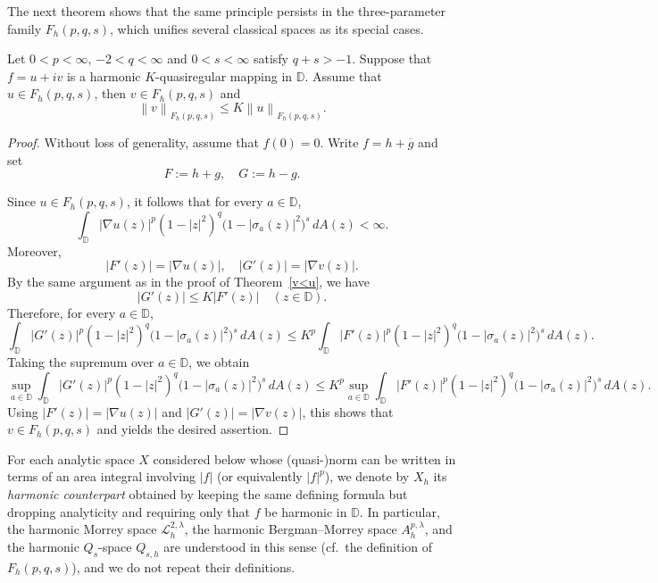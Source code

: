 \documentclass[12pt, reqno]{amsart}
\begin{document}
The next theorem shows that the same principle persists in the three-parameter family $F_h(p,q,s)$, which unifies several classical spaces as its special cases.

\begin{theorem}\label{v<u-F}
Let $0< p<\infty$, $-2<q<\infty$ and $0<s<\infty$ satisfy $q+s>-1$.
Suppose that $f=u+iv$ is a harmonic $K$-quasiregular mapping in $\mathbb D$.
Assume that $u\in F_h(p,q,s)$,
then $v\in F_h(p,q,s)$ and
$$\left \|v  \right \| _{F_h(p,q,s)}\le K\left \|u  \right \| _{F_h(p,q,s)}.$$
\end{theorem}

\begin{proof}
Without loss of generality, assume that $f(0)=0$. Write $f=h+\overline{g}$ and set
$$F:=h+g,\quad G:=h-g.$$

Since $u\in F_h(p,q,s)$, it follows that for every $a\in\mathbb D$,
$$
\int_{\mathbb{D}}|\nabla u(z)|^{p}(1-|z|^{2})^{q}\bigl(1-|\sigma_a(z)|^{2}\bigr)^{s}\,dA(z)<\infty.
$$
Moreover,
$$
|F'(z)|=\bigl|\nabla u(z)\bigr|,
\quad
|G'(z)|=\bigl|\nabla v(z)\bigr|.
$$
By the same argument as in the proof of Theorem~\ref{v<u}, we have
$$
|G'(z)|\le K|F'(z)|\quad (z\in\mathbb D).
$$
Therefore, for every $a\in\mathbb D$,
$$
\int_{\mathbb{D}}|G'(z)|^{p}(1-|z|^{2})^{q}\bigl(1-|\sigma_a(z)|^{2}\bigr)^{s}\,dA(z)
\le K^{p}\int_{\mathbb{D}}|F'(z)|^{p}(1-|z|^{2})^{q}\bigl(1-|\sigma_a(z)|^{2}\bigr)^{s}\,dA(z).
$$
Taking the supremum over $a\in\mathbb D$, we obtain
$$
\sup_{a\in\mathbb{D}}\int_{\mathbb{D}}|G'(z)|^{p}(1-|z|^{2})^{q}\bigl(1-|\sigma_a(z)|^{2}\bigr)^{s}\,dA(z)
\le K^{p}\sup_{a\in\mathbb{D}}\int_{\mathbb{D}}|F'(z)|^{p}(1-|z|^{2})^{q}\bigl(1-|\sigma_a(z)|^{2}\bigr)^{s}\,dA(z).
$$
Using $|F'(z)|=\bigl|\nabla u(z)\bigr|$ and $|G'(z)|=\bigl|\nabla v(z)\bigr|$, this shows that $v\in F_h(p,q,s)$ and yields the desired assertion.
\end{proof}

For each analytic space $X$ considered below whose (quasi-)norm can be written in terms of an area integral
involving $|f|$ (or equivalently $|f|^p$), we denote by $X_h$ its \emph{harmonic counterpart} obtained by keeping
the same defining formula but dropping analyticity and requiring only that $f$ be harmonic in $\mathbb D$.
In particular, the harmonic Morrey space $\mathcal L_h^{2,\lambda}$, the harmonic Bergman--Morrey space
$A_h^{p,\lambda}$, and the harmonic $Q_s$-space $Q_{s,h}$ are understood in this sense (cf.\ the definition of
$F_h(p,q,s)$), and we do not repeat their definitions.
\end{document}
